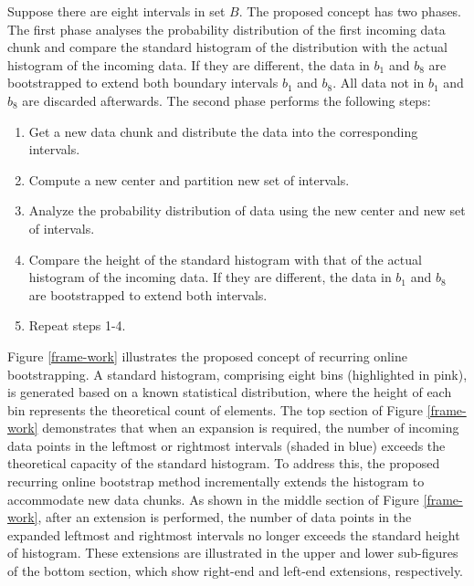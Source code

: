 \documentclass[a4paper,fleqn]{cas-dc}
\begin{document}
Suppose there are eight intervals in set $B$. The proposed concept has two phases. The first phase analyses 
the probability distribution of the
first incoming data chunk and compare the standard histogram of the distribution with the actual histogram
of the incoming data. If they are different, the data in $b_{1}$ and $b_{8}$ are bootstrapped to 
extend both boundary intervals $b_{1}$ and $b_{8}$. All data not in $b_{1}$ and $b_{8}$ are discarded afterwards. 
The second phase performs the following steps: 
\begin{enumerate}
\item Get a new data chunk and distribute the data into the corresponding intervals. 
\item Compute a new center and partition new set of intervals. 
\item Analyze the probability distribution of data using the new center and new set of intervals. 
\item Compare the height of the standard histogram with that of the actual histogram of the incoming data. If they are 
different, the data in $b_{1}$ and $b_{8}$ are bootstrapped to extend both intervals.
\item Repeat steps 1-4.
\end{enumerate}

Figure \ref{frame-work} illustrates the proposed concept of recurring online bootstrapping.  
A standard histogram, comprising eight bins (highlighted in pink), 
is generated based on a known statistical distribution, where the height of each bin represents the 
theoretical count of elements. The top section of Figure \ref{frame-work} demonstrates that when an expansion is required, the 
number of incoming data points in the leftmost or rightmost intervals (shaded in blue) exceeds the 
theoretical capacity of the standard histogram.
To address this, the proposed 
recurring online bootstrap method incrementally extends 
the histogram to accommodate new data chunks. As shown in the middle section of Figure 
\ref{frame-work}, after an extension is performed, the number of data points in the expanded leftmost 
and rightmost intervals no longer exceeds the standard height of histogram. These extensions are illustrated 
in the upper and lower sub-figures of the bottom section, which show  right-end  and  left-end 
extensions, respectively.
\end{document}

